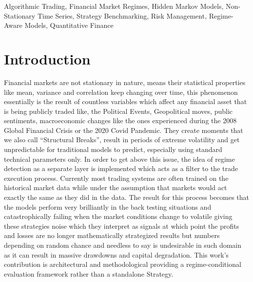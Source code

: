 \documentclass[conference]{IEEEtran}
\begin{document}
\begin{IEEEkeywords}
Algorithmic Trading, Financial Market Regimes, Hidden Markov Models, Non-Stationary Time Series, Strategy Benchmarking, Risk Management, Regime-Aware Models, Quantitative Finance
\end{IEEEkeywords}

\section{Introduction}

Financial markets are not stationary in nature, means their statistical properties like mean, variance and correlation keep changing over time, this phenomenon essentially is the result of countless variables which affect any financial asset that is being publicly traded like, the Political Events, Geopolitical moves, public sentiments, macroeconomic changes like the ones experienced during the 2008 Global Financial Crisis or the 2020 Covid Pandemic. They create moments that we also call ``Structural Breaks'', result in periods of extreme volatility and get unpredictable for traditional models to predict, especially using standard technical parameters only. In order to get above this issue, the idea of regime detection as a separate layer is implemented which acts as a filter to the trade execution process. Currently most trading systems are often trained on the historical market data while under the assumption that markets would act exactly the same as they did in the data. The result for this process becomes that the models perform very brilliantly in the back testing situations and catastrophically failing when the market conditions change to volatile giving these strategies noise which they interpret as signals at which point the profits and losses are no longer mathematically strategized results but numbers depending on random chance and needless to say is undesirable in such domain as it can result in massive drawdowns and capital degradation. This work's contribution is architectural and methodological providing a regime-conditional evaluation framework rather than a standalone Strategy. 
\end{document}
